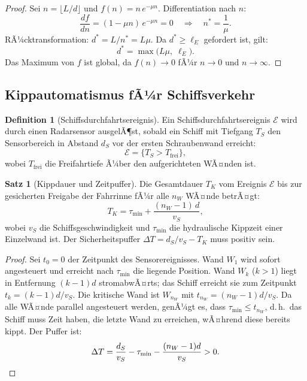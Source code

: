 ﻿\documentclass[a4paper,12pt]{article}
\theoremstyle{definition}
\newtheorem{definition}{Definition}
\newtheorem{satz}{Satz}
\begin{document}
\begin{proof}
Sei $n = \lfloor L/d \rfloor$ und $f(n) = n\,e^{-\mu n}$. Differentiation nach $n$:
\[
  \frac{df}{dn} = (1 - \mu n)\,e^{-\mu n} = 0 \quad\Rightarrow\quad n^* = \frac{1}{\mu}.
\]
RÃ¼cktransformation: $d^* = L/n^* = L\mu$. Da $d^* \geq \ell_E$ gefordert ist,
gilt:
\[
  d^* = \max\bigl(L\mu,\; \ell_E\bigr).
\]
Das Maximum von $f$ ist global, da $f(n) \to 0$ fÃ¼r $n \to 0$ und $n \to \infty$. \qedhere
\end{proof}

\subsection{Kippautomatismus fÃ¼r Schiffsverkehr}

\begin{definition}[Schiffsdurchfahrtsereignis]
Ein Schiffsdurchfahrtsereignis $\mathcal{E}$ wird durch einen Radarsensor ausgelÃ¶st,
sobald ein Schiff mit Tiefgang $T_S$ den Sensorbereich in Abstand $d_S$ vor der ersten
Schraubenwand erreicht:
\[
  \mathcal{E} = \bigl\{T_S > T_{\mathrm{frei}}\bigr\},
\]
wobei $T_{\mathrm{frei}}$ die Freifahrtiefe Ã¼ber den aufgerichteten WÃ¤nden ist.
\end{definition}

\begin{satz}[Kippdauer und Zeitpuffer]
\label{satz:kippdauer}
Die Gesamtdauer $T_K$ vom Ereignis $\mathcal{E}$ bis zur gesicherten Freigabe der
Fahrrinne fÃ¼r alle $n_W$ WÃ¤nde betrÃ¤gt:
\[
  T_K = \tau_{\mathrm{min}} + \frac{(n_W - 1)\,d}{v_S},
\]
wobei $v_S$ die Schiffsgeschwindigkeit und $\tau_{\mathrm{min}}$ die hydraulische
Kippzeit einer Einzelwand ist. Der Sicherheitspuffer $\Delta T = d_S/v_S - T_K$
muss positiv sein.
\end{satz}

\begin{proof}
Sei $t_0 = 0$ der Zeitpunkt des Sensorereignisses. Wand $W_1$ wird sofort
angesteuert und erreicht nach $\tau_{\mathrm{min}}$ die liegende Position. Wand
$W_k$ ($k > 1$) liegt in Entfernung $(k-1)d$ stromabwÃ¤rts; das Schiff erreicht sie
zum Zeitpunkt $t_k = (k-1)d/v_S$. Die kritische Wand ist $W_{n_W}$ mit
$t_{n_W} = (n_W-1)d/v_S$. Da alle WÃ¤nde parallel angesteuert werden, genÃ¼gt es,
dass $\tau_{\mathrm{min}} \leq t_{n_W}$, d.\,h.\ das Schiff muss Zeit haben, die letzte
Wand zu erreichen, wÃ¤hrend diese bereits kippt. Der Puffer ist:
\[
  \Delta T = \frac{d_S}{v_S} - \tau_{\mathrm{min}} - \frac{(n_W-1)d}{v_S} > 0. \qedhere
\]
\end{proof}
\end{document}
